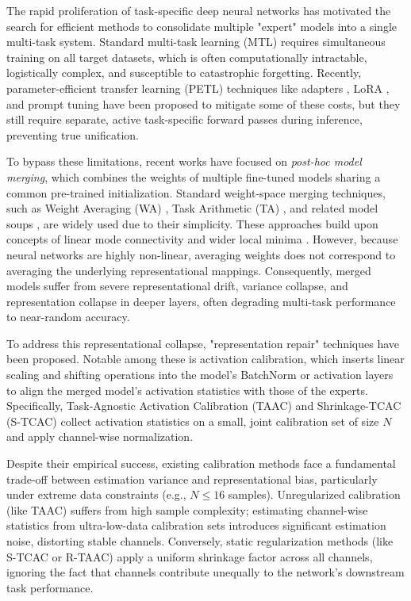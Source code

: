 \documentclass{article}
\theoremstyle{plain}
\theoremstyle{definition}
\theoremstyle{remark}
\begin{document}
The rapid proliferation of task-specific deep neural networks has motivated the search for efficient methods to consolidate multiple "expert" models into a single multi-task system. Standard multi-task learning (MTL) \cite{caruana1997multitask, zhang2021overview, ruder2017overview, crawshaw2020multi} requires simultaneous training on all target datasets, which is often computationally intractable, logistically complex, and susceptible to catastrophic forgetting. Recently, parameter-efficient transfer learning (PETL) techniques like adapters \cite{rebuffi2017learning, houlsby2019parameter, pfeiffer2020adapterhub, sung2021vladapter}, LoRA \cite{hu2021lora}, and prompt tuning \cite{lester2021power, li2021prefix, he2021towards} have been proposed to mitigate some of these costs, but they still require separate, active task-specific forward passes during inference, preventing true unification.

To bypass these limitations, recent works have focused on \textit{post-hoc model merging}, which combines the weights of multiple fine-tuned models sharing a common pre-trained initialization. Standard weight-space merging techniques, such as Weight Averaging (WA) \cite{wortsman22soups}, Task Arithmetic (TA) \cite{ilharco2022editing}, and related model soups \cite{wortsman22soups}, are widely used due to their simplicity. These approaches build upon concepts of linear mode connectivity and wider local minima \cite{izmailov2018swa, frankle2018lottery, wortsman2021subspaces, neyshabur2020what, entezari2021role}. However, because neural networks are highly non-linear, averaging weights does not correspond to averaging the underlying representational mappings. Consequently, merged models suffer from severe representational drift, variance collapse, and representation collapse in deeper layers, often degrading multi-task performance to near-random accuracy.

To address this representational collapse, "representation repair" techniques have been proposed. Notable among these is activation calibration, which inserts linear scaling and shifting operations into the model's BatchNorm or activation layers to align the merged model's activation statistics with those of the experts. Specifically, Task-Agnostic Activation Calibration (TAAC) and Shrinkage-TCAC (S-TCAC) \cite{submission3} collect activation statistics on a small, joint calibration set of size $N$ and apply channel-wise normalization. 

Despite their empirical success, existing calibration methods face a fundamental trade-off between estimation variance and representational bias, particularly under extreme data constraints (e.g., $N \le 16$ samples). Unregularized calibration (like TAAC) suffers from high sample complexity; estimating channel-wise statistics from ultra-low-data calibration sets introduces significant estimation noise, distorting stable channels. Conversely, static regularization methods (like S-TCAC or R-TAAC) apply a uniform shrinkage factor across all channels, ignoring the fact that channels contribute unequally to the network's downstream task performance.
\end{document}
